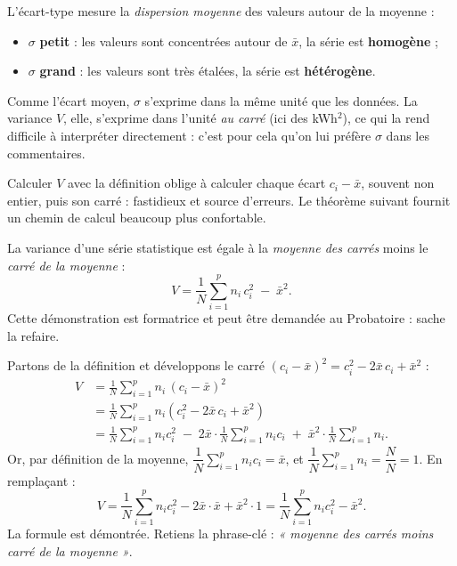 \documentclass[11pt]{article}
\newcounter{popsec}
\newcounter{popsub}
\newcommand{\courssub}[1]{%
  \stepcounter{popsub}%
  \par\vspace{9pt}\noindent{\popxbold\fontsize{11.5}{13}\selectfont\color{popink}{\color{poporange}\thepopsec.\thepopsub}\hspace{6pt}#1}\par\nopagebreak\vspace{4pt}
}
\begin{document}
\begin{aretenir}
L'écart-type mesure la \emph{dispersion moyenne} des valeurs autour de la moyenne :
\begin{itemize}
\item $\sigma$ \textbf{petit} : les valeurs sont concentrées autour de $\bar{x}$, la série est \textbf{homogène} ;
\item $\sigma$ \textbf{grand} : les valeurs sont très étalées, la série est \textbf{hétérogène}.
\end{itemize}
Comme l'écart moyen, $\sigma$ s'exprime dans la même unité que les données. La variance $V$, elle, s'exprime dans l'unité \emph{au carré} (ici des kWh$^2$), ce qui la rend difficile à interpréter directement : c'est pour cela qu'on lui préfère $\sigma$ dans les commentaires.
\end{aretenir}

\courssub{La formule de König-Huygens}

Calculer $V$ avec la définition oblige à calculer chaque écart $c_i - \bar{x}$, souvent non entier, puis son carré : fastidieux et source d'erreurs. Le théorème suivant fournit un chemin de calcul beaucoup plus confortable.

\begin{propriete}
La variance d'une série statistique est égale à la \emph{moyenne des carrés} moins le \emph{carré de la moyenne} :
\[ V = \frac{1}{N}\sum_{i=1}^{p} n_i\,c_i^2 \;-\; \bar{x}^2. \]
Cette démonstration est formatrice et peut être demandée au Probatoire : sache la refaire.
\end{propriete}

\begin{experience}
Partons de la définition et développons le carré $(c_i - \bar{x})^2 = c_i^2 - 2\bar{x}\,c_i + \bar{x}^2$ :
\begin{align*}
V &= \frac{1}{N}\sum_{i=1}^{p} n_i\,(c_i - \bar{x})^2 \\
  &= \frac{1}{N}\sum_{i=1}^{p} n_i\left(c_i^2 - 2\bar{x}\,c_i + \bar{x}^2\right) \\
  &= \frac{1}{N}\sum_{i=1}^{p} n_i c_i^2 \;-\; 2\bar{x}\cdot\frac{1}{N}\sum_{i=1}^{p} n_i c_i \;+\; \bar{x}^2\cdot\frac{1}{N}\sum_{i=1}^{p} n_i.
\end{align*}
Or, par définition de la moyenne, $\dfrac{1}{N}\displaystyle\sum_{i=1}^{p} n_i c_i = \bar{x}$, et $\dfrac{1}{N}\displaystyle\sum_{i=1}^{p} n_i = \dfrac{N}{N} = 1$. En remplaçant :
\[ V = \frac{1}{N}\sum_{i=1}^{p} n_i c_i^2 - 2\bar{x}\cdot\bar{x} + \bar{x}^2 \cdot 1 = \frac{1}{N}\sum_{i=1}^{p} n_i c_i^2 - \bar{x}^2. \]
La formule est démontrée. Retiens la phrase-clé : \emph{« moyenne des carrés moins carré de la moyenne »}.
\end{experience}
\end{document}
